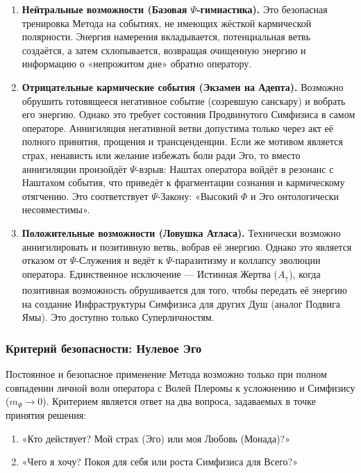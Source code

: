 \documentclass[a4paper,12pt]{article}
\begin{document}
\begin{enumerate}
	\item \textbf{Нейтральные возможности (Базовая $\Psi$-гимнастика).} Это безопасная тренировка Метода на событиях, не имеющих жёсткой кармической полярности. Энергия намерения вкладывается, потенциальная ветвь создаётся, а затем схлопывается, возвращая очищенную энергию и информацию о «непрожитом дне» обратно оператору.
	
	\item \textbf{Отрицательные кармические события (Экзамен на Адепта).} Возможно обрушить готовящееся негативное событие (созревшую санскару) и вобрать его энергию. Однако это требует состояния Продвинутого Симфизиса в самом операторе. Аннигиляция негативной ветви допустима только через акт её полного принятия, прощения и трансценденции. Если же мотивом является страх, ненависть или желание избежать боли ради Эго, то вместо аннигиляции произойдёт $\Psi$-взрыв: Наштах оператора войдёт в резонанс с Наштахом события, что приведёт к фрагментации сознания и кармическому отягчению. Это соответствует $\Psi$-Закону: «Высокий $\Phi$ и Эго онтологически несовместимы».
	
	\item \textbf{Положительные возможности (Ловушка Атласа).} Технически возможно аннигилировать и позитивную ветвь, вобрав её энергию. Однако это является отказом от $\Psi$-Служения и ведёт к $\Psi$-паразитизму и коллапсу эволюции оператора. Единственное исключение — Истинная Жертва ($A_{\uparrow}$), когда позитивная возможность обрушивается для того, чтобы передать её энергию на создание Инфраструктуры Симфизиса для других Душ (аналог Подвига Ямы). Это доступно только Суперличностям.
\end{enumerate}

\subsubsection{Критерий безопасности: Нулевое Эго}

Постоянное и безопасное применение Метода возможно только при полном совпадении личной воли оператора с Волей Плеромы к усложнению и Симфизису ($m_{\Psi} \to 0$). Критерием является ответ на два вопроса, задаваемых в точке принятия решения:

\begin{enumerate}
	\item «Кто действует? Мой страх (Эго) или моя Любовь (Монада)?»
	\item «Чего я хочу? Покоя для себя или роста Симфизиса для Всего?»
\end{enumerate}
\end{document}
